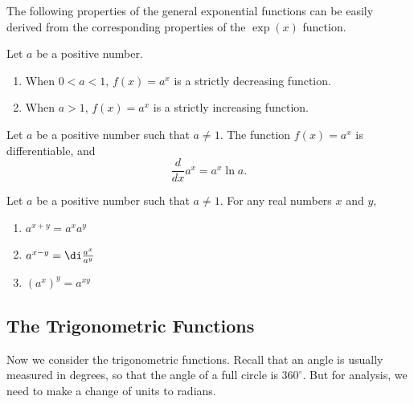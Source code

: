 The following properties of the general exponential functions can be easily derived from the  corresponding properties of the $\exp(x)$ function.  
\begin{proposition}{}Let $a$ be a positive number.
\begin{enumerate}[1.]
\item When $0<a<1$, $f(x)=a^x$ is a strictly decreasing function.
\item When $a>1$, $f(x)=a^x$ is a strictly increasing function.

\end{enumerate}
\end{proposition}
\begin{proposition}{}
Let $a$ be a positive number such that $a\neq 1$. The function $f(x)=a^x$ is differentiable, and 
\[\frac{d}{dx}a^x=a^x\ln a.\]
\end{proposition}

\begin{proposition}{}Let $a$ be a positive number such that $a\neq 1$. For any real numbers $x$ and $y$, 
\begin{enumerate}[1.]
\item  $a^{x+y}=a^xa^y$
\item $a^{x-y}=\di\frac{a^x}{a^y}$
\item $(a^x)^y=a^{xy}$
\end{enumerate}
\end{proposition}

\subsection{The Trigonometric Functions}
Now we consider the trigonometric functions.  
Recall that an angle is usually measured in degrees, so that the angle of a full circle is $360^{\circ}$. But for analysis, we need to make a change of units to radians.

